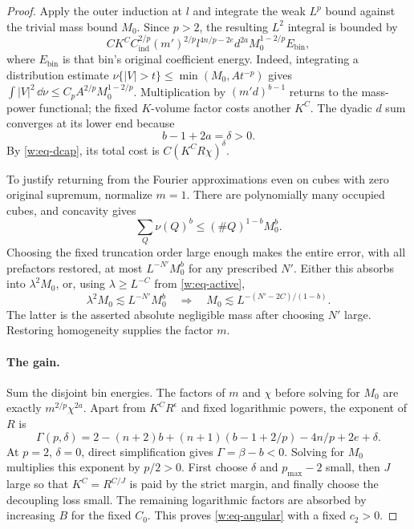 \begin{proof}
Apply the outer induction at $l$ and integrate the weak $L^p$ bound
against the trivial mass bound $M_0$.  Since $p>2$, the resulting
$L^2$ integral is bounded by
\begin{equation}\label{w:eq-terminalL2}
 CK^C C_{\mathrm{ind}}^{2/p}(m')^{2/p}
 l^{4n/p-2e}d^{2a}M_0^{1-2/p}E_{\mathrm{bin}},
\end{equation}
where $E_{\mathrm{bin}}$ is that bin's original coefficient energy.
Indeed, integrating a distribution estimate
$\nu\{|V|>t\}\leq\min(M_0,At^{-p})$ gives
$\int|V|^2\,\dd\nu\leq C_p A^{2/p}M_0^{1-2/p}$.
Multiplication by $(m'd)^{b-1}$ returns to the mass-power functional;
the fixed $K$-volume factor costs another $K^C$.  The dyadic $d$ sum
converges at its lower end because
\[
 b-1+2a=\delta>0.
\]
By \eqref{w:eq-dcap}, its total cost is
$C(K^CR\chi)^\delta$.

To justify returning from the Fourier approximations even on cubes
with zero original supremum, normalize $m=1$.  There are polynomially
many occupied cubes, and concavity gives
\[
 \sum_Q\nu(Q)^b\leq(\#Q)^{1-b}M_0^b.
\]
Choosing the fixed truncation order large enough makes the entire
error, with all prefactors restored, at most $L^{-N'}M_0^b$ for any
prescribed $N'$.  Either this absorbs into $\lambda^2M_0$, or, using
$\lambda\geq L^{-C}$ from \eqref{w:eq-active},
\[
 \lambda^2M_0\lesssim L^{-N'}M_0^b
 \quad\Longrightarrow\quad
 M_0\lesssim L^{-(N'-2C)/(1-b)}.
\]
The latter is the asserted absolute negligible mass after choosing
$N'$ large.  Restoring homogeneity supplies the factor $m$.

\paragraph{The gain.}
Sum the disjoint bin energies.  The factors of $m$ and $\chi$ before
solving for $M_0$ are exactly $m^{2/p}\chi^{2a}$.  Apart from
$K^CR^\epsilon$ and fixed logarithmic powers, the exponent of $R$ is
\begin{equation}\label{w:eq-Gamma}
 \Gamma(p,\delta)=2-(n+2)b+(n+1)(b-1+2/p)-4n/p+2e+\delta.
\end{equation}
At $p=2$, $\delta=0$, direct simplification gives
$\Gamma=\beta-b<0$.  Solving for $M_0$ multiplies this exponent by
$p/2>0$.  First choose $\delta$ and $p_{\max}-2$ small, then $J$
large so that $K^C=R^{C/J}$ is paid by the strict margin, and finally
choose the decoupling loss small.  The remaining logarithmic factors
are absorbed by increasing $B$ for the fixed $C_0$.  This proves
\eqref{w:eq-angular} with a fixed $c_2>0$.
\end{proof}
